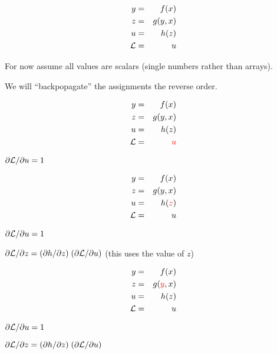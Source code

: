{
\vspace{-3ex}
\begin{eqnarray*}
  y & = & f(x) \\
  z & = & g(y,x) \\
  u & = & h(z) \\
  {\cal L} & = & u
\end{eqnarray*}

\medskip
For now assume all values are scalars (single numbers rather than arrays).

\medskip
We will ``backpopagate'' the assignments the reverse order.

\vspace{-3ex}
\begin{eqnarray*}
  y & = & f(x) \\
  z & = & g(y,x) \\
  u & = & h(z) \\
  {\cal L} &  = & {\color{red} u}
\end{eqnarray*}

\medskip
{\color{red} ${\partial {\cal L}}/{\partial u} = 1$}

\vspace{-3ex}
\begin{eqnarray*}
  y & = & f(x) \\
  z & = & g(y,x) \\
  u & = & h({\color{red} z}) \\
  {\cal L} &  = &  u
\end{eqnarray*}

\medskip
${\partial {\cal L}}/{\partial u} = 1$

\medskip
{\color{red} ${\partial {\cal L}}/{\partial z} = ({\partial h}/{\partial z})\; ({\partial {\cal L}}/{\partial u})$} (this uses the value of $z$)

\vspace{-3ex}
\begin{eqnarray*}
  y & = & f(x) \\
  z & = & g({\color{red} y},x) \\
  u & = & h(z) \\
  {\cal L} &  = &  u
\end{eqnarray*}

\medskip
${\partial {\cal L}}/{\partial u} = 1$

\medskip
${\partial {\cal L}}/{\partial z} = ({\partial h}/{\partial z}) \; ({\partial {\cal L}}/{\partial u})$

}

